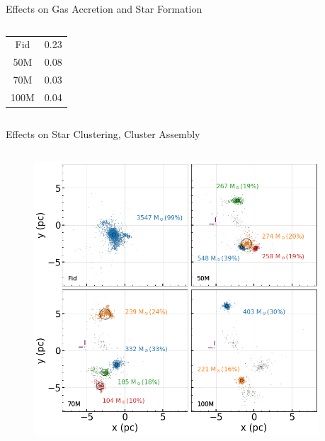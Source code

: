 \documentclass[aspectratio=169]{beamer}
\begin{document}
\begin{frame}{Effects on Gas Accretion and Star Formation}{}
\begin{columns}
\begin{column}{0.42\textwidth}
{\begin{table}[!htb]
\begin{tabular}{cc}
                    \hline
                    Fid & 0.23 \\
                    50M & 0.08 \\
                    70M & 0.03 \\
                    100M & 0.04 \\
                    \hline
                \end{tabular}
            \end{table}
            }
        \end{column}
    \end{columns}
\end{frame} 



\begin{frame}{Effects on Star Clustering, Cluster Assembly}{}
    \begin{columns}
        \begin{column}{0.45\textwidth}
            \begin{figure}[h!]
                \centering
                \includegraphics[width=\linewidth]{../images/cluster_grid.png} \\
                \label{fig:cluster_grid}
            \end{figure}
        \end{column}
        \begin{column}{0.45\textwidth}

\end{column}
\end{columns}
\end{frame}
\end{document}

